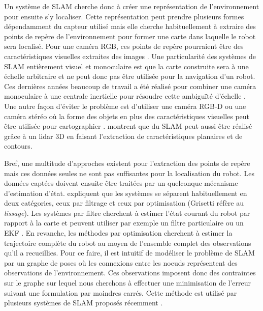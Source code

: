 Un système de SLAM cherche donc à créer une représentation de l'environnement pour ensuite s'y localiser. Cette représentation peut prendre plusieurs formes dépendamment du capteur utilisé mais elle cherche habituellement à extraire des points de repère de l'environnement pour former une carte dans laquelle le robot sera localisé. Pour une caméra RGB, ces points de repère pourraient être des caractéristiques visuelles extraites des images \citep{Mur-Artal2017}. Une particularité des systèmes de SLAM entièrement visuel et monoculaire est que la carte construite sera à une échelle arbitraire et ne peut donc pas être utilisée pour la navigation d'un robot. Ces dernières années beaucoup de travail a été réalisé pour combiner une caméra monoculaire à une centrale inertielle pour résoudre cette ambiguïté d'échelle \citep{muratal2017vimonoslam}. Une autre façon d'éviter le problème est d'utiliser une caméra RGB-D ou une caméra stéréo où la forme des objets en plus des caractéristiques visuelles peut être utilisée pour cartographier \citep{henry2014rgb}. \citep{Zhang2017} montrent que du SLAM peut aussi être réalisé grâce à un lidar 3D en faisant l'extraction de caractéristiques planaires et de contours.

Bref, une multitude d'approches existent pour l'extraction des points de repère mais ces données seules ne sont pas suffisantes pour la localisation du robot. Les données captées doivent ensuite être traitées par un quelconque mécanisme d'estimation d'état. \citep{Grisetti2010} expliquent que les systèmes se séparent habituellement en deux catégories, ceux par filtrage et ceux par optimisation (Grisetti réfère au \textit{lissage}). Les systèmes par filtre cherchent à estimer l'état courant du robot par rapport à la carte et peuvent utiliser par exemple un filtre particulaire \citep{Grisetti2007} ou un EKF \citep{Montemerlo03a}. En revanche, les méthodes par optimisation cherchent à estimer la trajectoire complète du robot au moyen de l'ensemble complet des observations qu'il a recueillies. Pour ce faire, il est intuitif de modéliser le problème de SLAM par un graphe de poses où les connexions entre les noeuds représentent des observations de l'environnement. Ces observations imposent donc des contraintes sur le graphe sur lequel nous cherchons à effectuer une minimisation de l'erreur suivant une formulation par moindres carrés. Cette méthode est utilisé par plusieurs systèmes de SLAM proposés récemment \citep{Labbe2014, Hess2016}.

